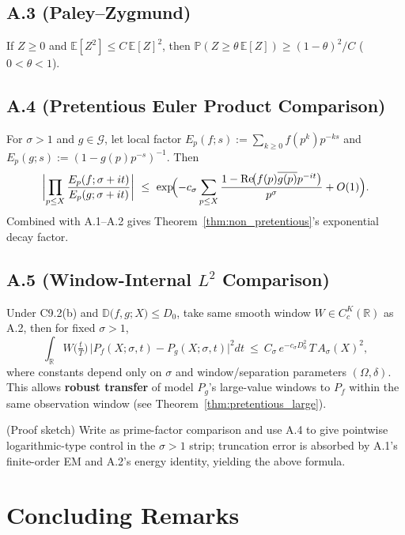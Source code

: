 \documentclass[11pt,a4paper]{article}
\theoremstyle{remark}
\DeclareMathOperator{\Re}{Re}
\begin{document}
\subsection{A.3 (Paley--Zygmund)}

If $Z\ge0$ and $\mathbb{E}[Z^2]\le C\,\mathbb{E}[Z]^2$, then $\mathbb{P}(Z\ge \theta\,\mathbb{E}[Z])\ge (1-\theta)^2/C$ ($0<\theta<1$).

\subsection{A.4 (Pretentious Euler Product Comparison)}

For $\sigma>1$ and $g\in\mathcal{G}$, let local factor $E_p(f;s):=\sum_{k\ge0}f(p^k)p^{-ks}$ and $E_p(g;s):=(1-g(p)p^{-s})^{-1}$. Then
\begin{equation}
\biggl|\prod_{p\le X}\frac{E_p(f;\sigma+it)}{E_p(g;\sigma+it)}\biggr|
\ \le\ \exp\!\Bigl(-c_\sigma\sum_{p\le X}\frac{1-\Re\!\bigl(f(p)\overline{g(p)}p^{-it}\bigr)}{p^{\sigma}}+O(1)\Bigr).
\end{equation}
Combined with A.1--A.2 gives Theorem~\ref{thm:non_pretentious}'s exponential decay factor.

\subsection{A.5 (Window-Internal $L^2$ Comparison)}

Under C9.2(b) and $\mathbb{D}\bigl(f,g;X\bigr)\le D_0$, take same smooth window $W\in C_c^K(\mathbb{R})$ as A.2, then for fixed $\sigma>1$,
\begin{equation}
\int_{\mathbb{R}} W\!\Big(\tfrac{t}{T}\Big)\,\big|P_f(X;\sigma,t)-P_g(X;\sigma,t)\big|^2 dt
\ \le\ C_\sigma\,e^{-c_\sigma D_0^2}\,T\,A_\sigma(X)^2,
\end{equation}
where constants depend only on $\sigma$ and window/separation parameters $(\Omega,\delta)$. This allows \textbf{robust transfer} of model $P_g$'s large-value windows to $P_f$ within the same observation window (see Theorem~\ref{thm:pretentious_large}).

(Proof sketch) Write as prime-factor comparison and use A.4 to give pointwise logarithmic-type control in the $\sigma>1$ strip; truncation error is absorbed by A.1's finite-order EM and A.2's energy identity, yielding the above formula.

\section*{Concluding Remarks}
\end{document}

